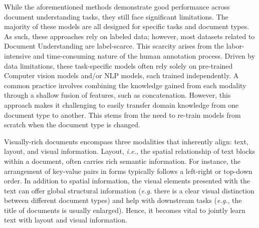 While the aforementioned methods demonstrate good performance across document understanding tasks, they still face significant limitations. The majority of these models are all designed for specific tasks and document types. As such, these approaches rely on labeled data; however, most datasets related to Document Understanding are label-scarce. This scarcity arises from the labor-intensive and time-consuming nature of the human annotation process. Driven by data limitations, these task-specific models often rely solely on pre-trained Computer vision models and/or \ac{NLP} models, each trained independently. A common practice involves combining the knowledge gained from each modality through a shallow fusion of features, such as concatenation. However, this approach makes it challenging to easily transfer domain knowledge from one document type to another. This stems from the need to re-train models from scratch when the document type is changed.



Visually-rich documents encompass three modalities that inherently align: text, layout, and visual information. Layout, \textit{i.e.}, the spatial relationship of text blocks within a document, often carries rich semantic information. For instance, the arrangement of key-value pairs in forms typically follows a left-right or top-down order. In addition to spatial information, the visual elements presented with the text can offer global structural information (\textit{e.g.} there is a clear visual distinction between different document types) and help with downstream tasks (\textit{e.g.}, the title of documents is usually enlarged). Hence, it becomes vital to jointly learn text with layout and visual information.

